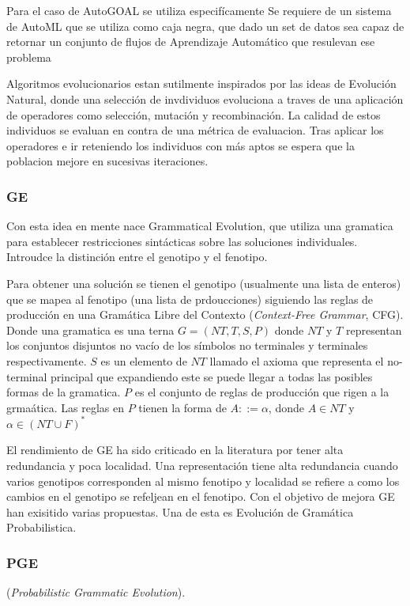 Para el caso de AutoGOAL se utiliza especif\'icamente 
Se requiere de un sistema de AutoML que se utiliza como caja negra, que dado un set de datos sea capaz de retornar un conjunto de flujos de Aprendizaje Autom\'atico  que resulevan ese problema

Algoritmos evolucionarios estan sutilmente inspirados por las ideas de Evoluci\'on Natural, donde una selecci\'on de invdividuos evoluciona a traves de una aplicaci\'on de operadores como selecci\'on, mutaci\'on y recombinaci\'on. La calidad de estos individuos se evaluan en contra de una m\'etrica de evaluacion. Tras aplicar los operadores e ir reteniendo los individuos con m\'as aptos se espera que la poblacion mejore en sucesivas iteraciones.

\subsubsection{GE}
Con esta idea en mente nace Grammatical Evolution, que utiliza una gramatica para establecer restricciones sint\'acticas sobre las soluciones individuales. Introudce la distinci\'on entre el genotipo y el fenotipo. 

Para obtener una soluci\'on se tienen el genotipo (usualmente una lista de enteros) que se mapea al fenotipo (una lista de prdoucciones) siguiendo las reglas de producci\'on en una Gram\'atica Libre del Contexto (\textit{Context-Free Grammar}, CFG). Donde una gramatica es una terna $G = (NT, T, S, P)$ donde $NT$ y $T$ representan los conjuntos disjuntos no vac\'io de los s\'imbolos no terminales y terminales respectivamente. $S$ es un elemento de $NT$ llamado el axioma que representa el no-terminal principal que expandiendo este se puede llegar a todas las posibles formas de la gramatica. $P$ es el conjunto de reglas de producci\'on que rigen a la grma\'atica. Las reglas en $P$ tienen la forma de $A ::= \alpha$, donde $A \in NT$ y  $\alpha \in (NT \cup F)^*$ 


El rendimiento de GE ha sido criticado en la literatura por tener alta redundancia y poca localidad. Una representaci\'on tiene alta redundancia cuando varios genotipos corresponden al mismo fenotipo y localidad se refiere a como los cambios en el genotipo se refeljean en el fenotipo. Con el objetivo de mejora GE han exisitido varias propuestas. Una de esta es Evoluci\'on de Gram\'atica Probabilistica.


\subsubsection{PGE}
 (\textit{Probabilistic Grammatic Evolution}).

